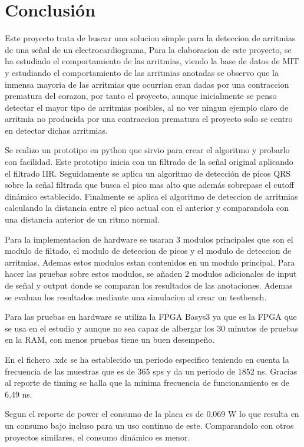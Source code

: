 \chapter{Conclusión}
Este proyecto trata de buscar una solucion simple para la deteccion de 
arritmias de una señal de un electrocardiograma, Para la elaboracion de este proyecto, 
se ha estudiado el comportamiento de las arritmias, viendo la base de datos de MIT y estudiando
el comportamiento de las arritmias anotadas se observo que la inmensa mayoria de las arritmias 
que ocurrian eran dadas por una contraccion prematura del corazon, por tanto el proyecto, aunque
inicialmente se penso detectar el mayor tipo de arritmias posibles, al no ver ningun ejemplo claro
de arritmia no producida por una contraccion prematura el proyecto solo se centro en detectar dichas arritmias.

Se realizo un prototipo en python que sirvio para crear el algoritmo y probarlo con facilidad. Este prototipo inicia
con un filtrado de la señal original aplicando el filtrado IIR. Seguidamente se aplica un algoritmo de detección de 
picos QRS sobre la señal filtrada que busca el pico mas alto que además sobrepase el cutoff dinámico establecido. Finalmente
se aplica el algoritmo de deteccion de arritmias calculando la distancia entre el pico actual con el anterior y comparandola con una
distancia anterior de un ritmo normal.

Para la implementacion de hardware se usaran 3 modulos principales que son el modulo de filtado, el modulo de deteccion de picos 
y el modulo de deteccion de arritmias. Ademas estos modulos estan contenidos en un modulo principal. Para hacer las pruebas sobre
estos modulos, se añaden 2 modulos adicionales de input de señal y output donde se comparan los resultados de las anotaciones. Ademas 
se evaluan los resultados mediante una simulacion al crear un testbench.

Para las pruebas en hardware se utiliza la FPGA Basys3 ya que es la FPGA que se usa en el estudio y aunque no sea capaz de 
albergar los 30 minutos de pruebas en la RAM, con menos pruebas tiene un buen desempeño.

En el fichero .xdc se ha establecido un periodo especifico teniendo en cuenta la frecuencia de las muestras que es de 365 sps y da un periodo 
de 1852 ns. Gracias al reporte de timing se halla que la minima frecuencia de funcionamiento es de 6,49 ns.

Segun el reporte de power el consumo de la placa es de 0,069 W lo que resulta en un consumo bajo incluso para un uso continuo de este.
Comparandolo con otros proyectos similares, el consumo dinámico es menor.

